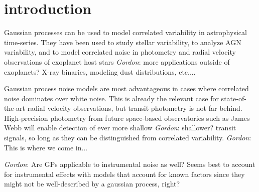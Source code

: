 \documentclass[modern]{aastex62}
\newcommand{\todo}[3]{{\color{#2}\emph{#1}: #3}}
\newcommand{\gordontodo}[1]{\todo{Gordon}{red}{#1}}
\begin{document}
\tableofcontents

\section{introduction}\label{sec:intro}
	Gaussian processes can be used to model correlated variability in astrophysical time-series. They have been used to study stellar variability, to analyze AGN 
	variability, and to model correlated noise in photometry and radial velocity observations of exoplanet host stars \gordontodo{more applications outside of exoplanets? 
	X-ray binaries, modeling dust distributions, etc...}. 
	
	Gaussian process noise models are most 
	advantageous in cases where correlated noise dominates over white noise. This is already the relevant case for state-of-the-art radial velocity observations, but transit 
	photometry is not far behind. High-precision photometry from future space-based observatories such as James Webb will enable detection of ever more shallow 
	\gordontodo{shallower?}
	transit signals, so long as they can be distinguished from correlated variability. \gordontodo{This is where we come in...}
	
	\gordontodo{Are GPs applicable to instrumental noise as well? Seems best to account for instrumental effects with models that account for known factors since 
	they might not be well-described by a gaussian process, right?}
	
\end{document}
